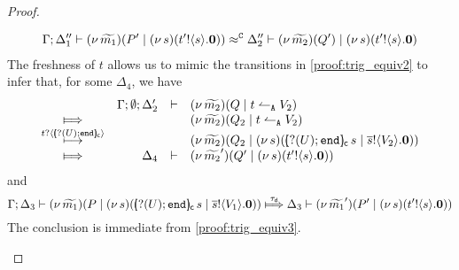 \begin{proof}
\begin{enumerate}[1.]
\begin{enumerate}
							\begin{eqnarray}
								\Gamma; \Delta_1'' \vdash (\nu\, \widetilde{m_1})(P' \;|\; (\nu\, s)(t' ! \langle s \rangle . \mathbf{0}) ) \approx^\mathtt{C} \Delta_2'' \vdash (\nu\, \widetilde{m_2})(Q')  \;|\; (\nu\, s)(t' ! \langle s \rangle . \mathbf{0})
								\label{proof:trig_equiv3}
							\end{eqnarray}
							The freshness of $t$ allows us to mimic the transitions
							in \eqref{proof:trig_equiv2} to infer that, for some $\Delta_4$,
							we have
							\begin{eqnarray*}
								\begin{array}{crll}
									& \Gamma; \es; \Delta_2' & \proves &		
									\newsp{\widetilde{m_2}}{Q \Par \ntrigger{t}{V_2}}
									\\
									\Hby{} &&&
									\newsp{\widetilde{m_2}}{Q_2 \Par \ntrigger{t}{V_2}}
									\\
									{\hby{\bactinp{t}{\omapchar{\btinp{U} \tinact}}}}& & &
									\newsp{\widetilde{m_2}}{Q_2 \Par \newsp{s}{\appl{\omapchar{\btinp{U} \tinact}}{s} \Par \bout{\dual{s}}{V_2} \inact}}
									\\
									\Hby{} & \Delta_4 & \proves & \newsp{\widetilde{m_2}'}{Q' \Par \newsp{s}{\bout{t'}{s} \inact} }
								\end{array}
							\end{eqnarray*}
							and 
							\[
								\horel{\Gamma}{\Delta_3}{\newsp{\widetilde{m_1}}{P \Par \newsp{s}{ \appl{\omapchar{\btinp{U} \tinact}}{s} \Par \bout{\dual{s}}{V_1} \inact}}}
								{\Hby{\dtau}}
								{\Delta_3}{\newsp{\widetilde{m_1}'}{P' \Par \newsp{s}{ \bout{t'}{s} \inact}}}
							\]
							The conclusion is immediate from \eqref{proof:trig_equiv3}.


\end{enumerate}
\end{enumerate}
\end{proof}
